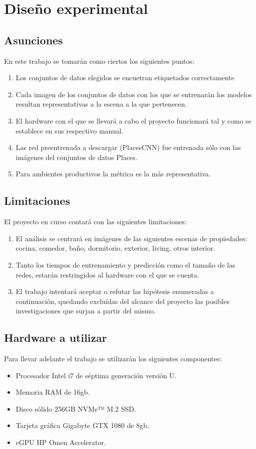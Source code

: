 \section{Diseño experimental}
\subsection{Asunciones}
En este trabajo se tomarán como ciertos los siguientes puntos:
\begin{enumerate}
	\item Los conjuntos de datos elegidos se encuetran etiquetados correctamente 
	\item Cada imagen de los conjuntos de datos con los que se entrenarán los modelos resultan representativas a la escena a la que pertenecen.
	\item El hardware con el que se llevará a cabo el proyecto funcionará tal y como se establece en sus respectivo manual.
	\item Las red preentrenada a descargar (PlacesCNN) fue entrenada sólo con las imágenes del conjuntos de datos Places.
	\item Para ambientes productivos la métrica \cite{balanced_accuracy_score} es la más representativa.
\end{enumerate}

\subsection{Limitaciones} \label{ssec:limitaciones}
El proyecto en curso contará con las siguientes limitaciones:
\begin{enumerate}
	\item El análisis se centrará en imágenes de las siguientes escenas de propiedades: cocina, comedor, baño, dormitorio, exterior, living, otros interior.
	\item Tanto los tiempos de entrenamiento y predicción como el tamaño de las redes, estarán restringidos al hardware con el que se cuenta.
	\item El trabajo intentará aceptar o refutar las hipótesis enumeradas a continuación, quedando excluídas del alcance del proyecto las posibles investigaciones que surjan a partir del mismo.
\end{enumerate}

\subsection{Hardware a utilizar} \label{ssec:hardware}
Para llevar adelante el trabajo se utilizarán los siguientes componentes:
\begin{itemize}
	\item Procesador Intel i7 de séptima generación versión U.
	\item Memoria RAM de 16gb.
	\item Disco sólido 256GB NVMe™ M.2 SSD.
	\item Tarjeta gráfica Gigabyte GTX 1080 de 8gb.
	\item eGPU HP Omen Accelerator.
\end{itemize}

